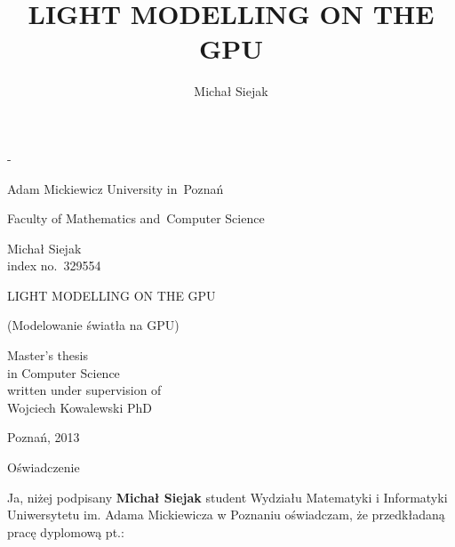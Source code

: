 \documentclass[oneside,openright,a4paper,12pt]{memoir}
\theoremstyle{definition}
\begin{document}
\title{LIGHT MODELLING ON THE GPU}
\author{Michał Siejak}

\frontmatter
{}

\begin{titlingpage}
\calccentering{\unitlength}
\begin{adjustwidth*}{\unitlength}{-\unitlength}
\begin{center}
  
 \begin{LARGE}
   Adam Mickiewicz University in~Poznań\\
   \begin{Large}
     Faculty of Mathematics and~Computer Science\\
   \end{Large}
   \vspace{1.5cm}
   \begin{huge}
     Michał Siejak\\
     \small{index no.~329554}\\
   \end{huge}
   \vspace{1.5cm}
   \begin{Huge}
     LIGHT MODELLING ON THE GPU
   \end{Huge}
   \vspace{0.3cm}
   \begin{footnotesize}
     (Modelowanie światła na GPU)
   \end{footnotesize}
   \vspace{2.0cm}
    \begin{flushleft}
      \hsize
      \large
      Master's thesis\\
      in Computer Science\\
      written under supervision of\\
      Wojciech Kowalewski PhD\\
    \end{flushleft}
    \vfill
    Poznań, 2013
 \end{LARGE}
\end{center}
\end{adjustwidth*}
\end{titlingpage}

\setcounter{page}{2}

\begin{center}
  \LARGE{Oświadczenie}
\end{center}

Ja, niżej podpisany \textbf{Michał Siejak} student Wydziału
Matematyki i Informatyki Uniwersytetu im. Adama Mickiewicza w Poznaniu
oświadczam, że przedkładaną pracę dyplomową pt.:
\end{document}
